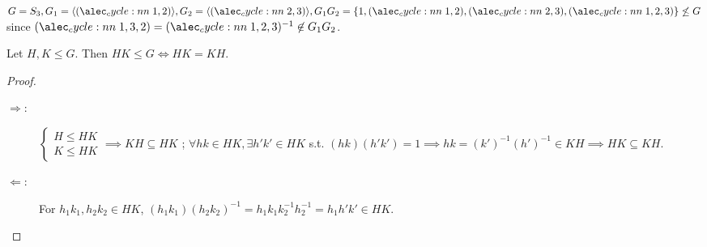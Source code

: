 \begin{example}
  $G = S_3, G_1 = \langle \cycle{1,2} \rangle, G_2 = \langle \cycle{2,3} \rangle,
  G_1G_2 = \{ 1, \cycle{1,2}, \cycle{2,3}, \cycle{1,2,3} \} \not\le G$
  since $\cycle{1,3,2} = \cycle{1,2,3}^{-1} \not\in G_1G_2$.
\end{example}

\begin{prop}
  Let $H, K \le G$. Then $HK \le G \iff HK = KH$.
  \begin{proof} \mbox{}
    \begin{description}
      \item[$\Rightarrow:$] $\begin{cases} H \le HK \\ K \le HK \end{cases}
          \implies KH \subseteq HK$ ;
          $\forall hk \in HK, \exists h'k' \in HK$ s.t. $(hk)(h'k') = 1 \implies
          hk = (k')^{-1}(h')^{-1} \in KH \implies HK \subseteq KH$.
      \item[$\Leftarrow:$] For $h_1k_1, h_2k_2 \in HK$, $(h_1k_1)(h_2k_2)^{-1}
        = h_1k_1k_2^{-1}h_2^{-1} = h_1h'k' \in HK$.
    \end{description}
  \end{proof}
\end{prop}
